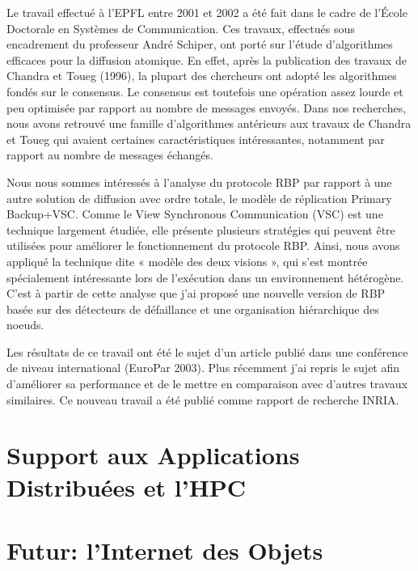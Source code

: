 \documentclass[a4paper]{book}
\begin{document}
Le travail effectué à l'EPFL entre 2001 et 2002 a été fait dans le cadre de l'École Doctorale en Systèmes de Communication. Ces travaux, effectués sous encadrement du professeur André Schiper, ont porté sur l'étude d'algorithmes efficaces pour la diffusion atomique. En effet, après la publication des travaux de Chandra et Toueg (1996), la plupart des chercheurs ont adopté les algorithmes fondés sur le consensus. Le consensus est toutefois une opération assez lourde et peu optimisée par rapport au nombre de messages envoyés. Dans nos recherches, nous avons retrouvé une famille d'algorithmes antérieurs aux travaux de Chandra et Toueg qui avaient certaines caractéristiques intéressantes, notamment par rapport au nombre de messages échangés.

Nous nous sommes intéressés à l'analyse du protocole RBP par rapport à une autre solution de diffusion avec ordre totale, le modèle de réplication Primary Backup+VSC. Comme le View Synchronous Communication (VSC) est une technique largement étudiée, elle présente plusieurs stratégies qui peuvent être utilisées pour améliorer le fonctionnement du protocole RBP. Ainsi, nous avons appliqué la technique dite « modèle des deux visions », qui s'est montrée spécialement intéressante lors de l'exécution dans un environnement hétérogène. C'est à partir de cette analyse que j'ai proposé une nouvelle version de RBP basée sur des détecteurs de défaillance et une organisation hiérarchique des noeuds.

Les résultats de ce travail ont été le sujet d'un article publié dans une conférence de niveau international (EuroPar 2003). Plus récemment j'ai repris le sujet afin d'améliorer sa performance et de le mettre en comparaison avec d'autres travaux similaires. Ce nouveau travail a été publié comme rapport de recherche INRIA.





\section{Support aux Applications Distribuées et l'HPC}


\section{Futur: l'Internet des Objets}



\end{document}
